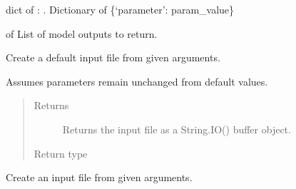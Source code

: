 \documentclass[letterpaper,10pt,english]{sphinxmanual}
\begin{document}
\begin{fulllineitems}
\begin{fulllineitems}
\end{fulllineitems}


\begin{fulllineitems}
\label{\detokenize{bcmdModel:bayescmd.bcmdModel.input_creation.InputCreator.params}}
dict of : . \textendash{} Dictionary of \{‘parameter’: param\_value\}

\end{fulllineitems}


\begin{fulllineitems}
\label{\detokenize{bcmdModel:bayescmd.bcmdModel.input_creation.InputCreator.outputs}}
 of  \textendash{} List of model outputs to return.

\end{fulllineitems}


\begin{fulllineitems}
\label{\detokenize{bcmdModel:bayescmd.bcmdModel.InputCreator.default_creation}}
Create a default input file from given arguments.

Assumes parameters remain unchanged from default values.
\begin{quote}\begin{description}
\item[{Returns}] \leavevmode
Returns the input file as a String.IO() buffer object.

\item[{Return type}] \leavevmode
{}

\end{description}\end{quote}

\end{fulllineitems}


\begin{fulllineitems}
\label{\detokenize{bcmdModel:bayescmd.bcmdModel.InputCreator.initialised_creation}}
Create an input file from given arguments.


\end{fulllineitems}
\end{fulllineitems}
\end{document}
